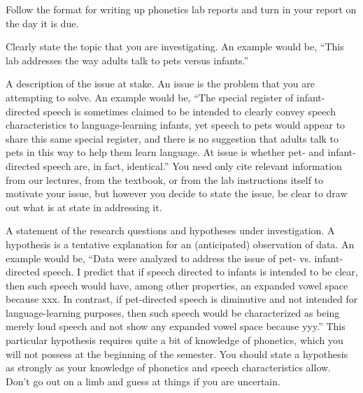 \documentclass[lab=1,title={Speaking rate},turnin=false]{com310lab}
\begin{document}
\begin{writeup}
	Follow the format for writing up phonetics lab reports and turn in your report on the day it is due.
\end{writeup}

\pagebreak

\labtitle

\begin{topic}
	Clearly state the topic that you are investigating.
	An example would be, ``This lab addresses the way adults talk to pets versus infants.''
\end{topic}

\begin{issue}
	A description of the issue at stake.
	An issue is the problem that you are attempting to solve.
	An example would be,
	``The special register of infant-directed speech is sometimes claimed to be intended to clearly convey speech characteristics to language-learning infants, yet speech to pets would appear to share this same special register, and there is no suggestion that adults talk to pets in this way to help them learn language.
	At issue is whether pet- and infant-directed speech are, in fact, identical.''
	You need only cite relevant information from our lectures, from the textbook, or from the lab instructions itself to motivate your issue, but however you decide to state the issue, be clear to draw out what is at state in addressing it.
\end{issue}

\begin{hypothesis}
	A statement of the research questions and hypotheses under investigation.
	A hypothesis is a tentative explanation for an (anticipated) observation of data.
	An example would be, ``Data were analyzed to address the issue of pet- vs. infant-directed speech.
	I predict that if speech directed to infants is intended to be clear, then such speech would have, among other properties, an expanded vowel space because xxx.
	In contrast, if pet-directed speech is diminutive and not intended for language-learning purposes, then such speech would be characterized as being merely loud speech and not show any expanded vowel space because yyy.''
	This particular hypothesis requires quite a bit of knowledge of phonetics, which you will not possess at the beginning of the semester.
	You should state a hypothesis as strongly as your knowledge of phonetics and speech characteristics allow.
	Don’t go out on a limb and guess at things if you are uncertain.
\end{hypothesis}
\end{document}
